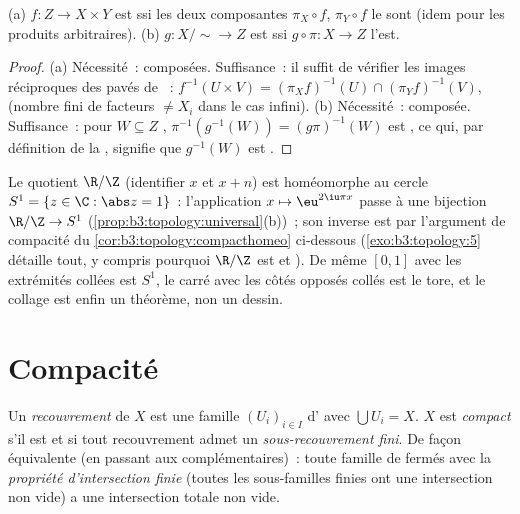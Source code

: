 \begin{proposition}
\label{prop:b3:topology:universal}
(a) $f \colon Z \to X \times Y$ est  ssi les deux
composantes $\pi_X \circ f$, $\pi_Y \circ f$ le sont (idem pour
les produits arbitraires).
(b) $g \colon X/{\sim} \to Z$ est  ssi $g \circ \pi
\colon X \to Z$ l'est.
\end{proposition}

\begin{proof}
(a) Nécessité~: composées. Suffisance~: il suffit de vérifier
les images réciproques des pavés de ~: $f^{-1}(U \times V)
= (\pi_Xf)^{-1}(U) \cap (\pi_Yf)^{-1}(V)$,  (nombre fini
de facteurs $\neq X_i$ dans le cas infini). (b) Nécessité~:
composée. Suffisance~: pour $W \subseteq Z$ ,
$\pi^{-1}(g^{-1}(W)) = (g\pi)^{-1}(W)$ est , ce qui, par
définition de la , signifie que $g^{-1}(W)$
est .
\end{proof}

\begin{example}\label{ex:b3:topology:circle}
Le quotient $\R/\Z$ (identifier $x$ et $x + n$) est
homéomorphe au cercle $S^1 = \{z \in \C : \abs z = 1\}$~:
l'application $x \mapsto \eu^{2\iu\pi x}$ passe à une bijection
 $\R/\Z \to S^1$ (\cref{prop:b3:topology:universal}(b))~;
son inverse est  par l'argument de compacité du
\cref{cor:b3:topology:compacthomeo} ci-dessous
(\cref{exo:b3:topology:5} détaille tout, y compris pourquoi
$\R/\Z$ est  et ). De même $[0,1]$ avec les
extrémités collées est $S^1$, le carré avec les côtés
opposés collés est le tore, et le collage est enfin un
théorème, non un dessin.
\end{example}

\section{Compacité}

\begin{definition}\label{def:b3:topology:compact}
Un \emph{recouvrement } de $X$ est une famille
$(U_i)_{i\in I}$ d' avec $\bigcup U_i = X$. $X$ est
\emph{compact} s'il est  et si
tout recouvrement  admet un \emph{sous-recouvrement
fini}. De façon équivalente (en passant aux complémentaires)~:
toute famille de fermés avec la \emph{propriété d'intersection
finie} (toutes les sous-familles finies ont une intersection
non vide) a une intersection totale non vide.
\end{definition}

